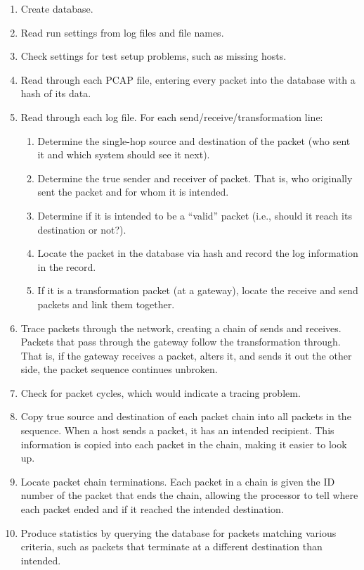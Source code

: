 \begin{enumerate}
\item Create database.
\item Read run settings from log files and file names.
\item Check settings for test setup problems, such as missing hosts.
\item Read through each \ac{PCAP} file, entering every packet into the database with a hash of its data.
\item Read through each log file. For each send/receive/transformation line:
	\begin{enumerate}
	\item Determine the single-hop source and destination of the packet (who sent it and which system should see it next).
	\item Determine the true sender and receiver of packet. That is, who originally sent the packet and for whom it is intended.
	\item Determine if it is intended to be a ``valid'' packet (i.e., should it reach its destination or not?).
	\item Locate the packet in the database via hash and record the log information in the record.
	\item If it is a transformation packet (at a gateway), locate the receive and send packets and link them together.
	\end{enumerate}
\item Trace packets through the network, creating a chain of sends and receives. Packets that pass through the gateway follow the transformation through. That is, if the gateway receives a packet, alters it, and sends it out the other side, the packet sequence continues unbroken.
\item Check for packet cycles, which would indicate a tracing problem.
\item Copy true source and destination of each packet chain into all packets in the sequence. When a host sends a packet, it has an intended recipient. This information is copied into each packet in the chain, making it easier to look up.
\item Locate packet chain terminations. Each packet in a chain is given the ID number of the packet that ends the chain, allowing the processor to tell where each packet ended and if it reached the intended destination.
\item Produce statistics by querying the database for packets matching various criteria, such as packets that terminate at a different destination than intended.
\end{enumerate}

